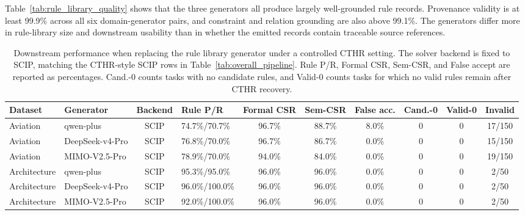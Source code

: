 ﻿\documentclass[a4paper,fleqn]{cas-dc}
\newcommand{\CTHR}{\textsc{CTHR}}
\begin{document}
Table~\ref{tab:rule_library_quality} shows that the three generators all
produce largely well-grounded rule records. Provenance validity is at least
99.9\% across all six domain-generator pairs, and constraint and relation
grounding are also above 99.1\%. The generators differ more in rule-library
size and downstream usability than in whether the emitted records contain
traceable source references.
\FloatBarrier

\begin{table}[t]
\centering
\caption{Downstream performance when replacing the rule library generator under
a controlled \CTHR{} setting. The solver backend is fixed to SCIP, matching the
\CTHR{}-style SCIP rows in Table~\ref{tab:overall_pipeline}. Rule P/R, Formal
CSR, Sem-CSR, and False accept are reported as percentages. Cand.-0 counts tasks
with no candidate rules, and Valid-0 counts tasks for which no valid rules
remain after \CTHR{} recovery.}
\label{tab:rule_library_downstream}
\scriptsize
\setlength{\tabcolsep}{2.4pt}
\renewcommand{\arraystretch}{0.92}
\begin{tabular*}{\textwidth}{@{}l@{\extracolsep{\fill}}lclcccccc@{}}
\toprule
Dataset & Generator & Backend & Rule P/R & Formal CSR &
Sem-CSR & False acc. & Cand.-0 & Valid-0 & Invalid \\
\midrule
Aviation & qwen-plus & SCIP & 74.7\%/70.7\% & 96.7\% & 88.7\% & 8.0\% & 0 & 0 & 17/150 \\
Aviation & DeepSeek-v4-Pro & SCIP & 76.8\%/70.0\% & 96.7\% & 86.7\% & 0.0\% & 0 & 0 & 15/150 \\
Aviation & MIMO-V2.5-Pro & SCIP & 78.9\%/70.0\% & 94.0\% & 84.0\% & 0.0\% & 0 & 0 & 19/150 \\
\midrule
Architecture & qwen-plus & SCIP & 95.3\%/95.0\% & 96.0\% & 96.0\% & 0.0\% & 0 & 0 & 2/50 \\
Architecture & DeepSeek-v4-Pro & SCIP & 96.0\%/100.0\% & 96.0\% & 96.0\% & 0.0\% & 0 & 0 & 2/50 \\
Architecture & MIMO-V2.5-Pro & SCIP & 92.0\%/100.0\% & 96.0\% & 96.0\% & 0.0\% & 0 & 0 & 2/50 \\
\bottomrule
\end{tabular*}
\end{table}
\end{document}
